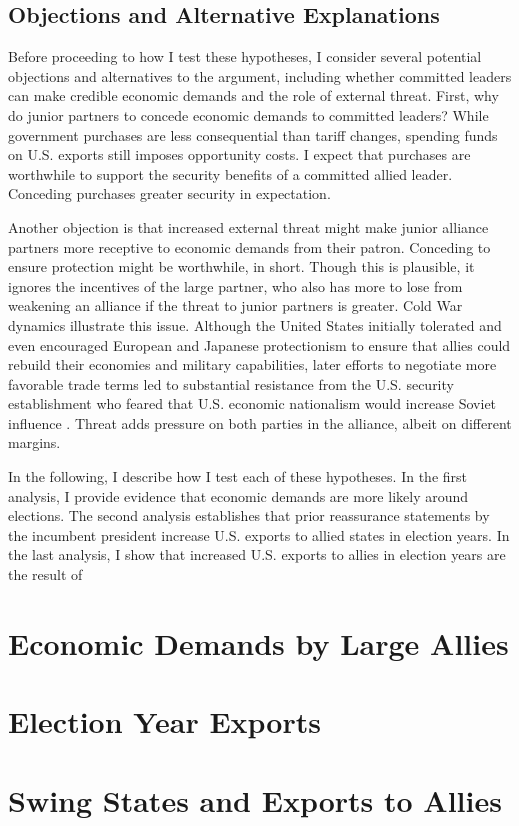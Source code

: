 \documentclass[12pt]{article}
\begin{document}
\subsection{Objections and Alternative Explanations}


Before proceeding to how I test these hypotheses, I consider several potential objections and alternatives to the argument, including whether committed leaders can make credible economic demands and the role of external threat.
First, why do junior partners to concede economic demands to committed leaders? 
While government purchases are less consequential than tariff changes, spending funds on U.S. exports still imposes opportunity costs.
I expect that purchases are worthwhile to support the security benefits of a committed allied leader. 
Conceding purchases greater security in expectation. 


Another objection is that increased external threat might make junior alliance partners more receptive to economic demands from their patron.
Conceding to ensure protection might be worthwhile, in short.
Though this is plausible, it ignores the incentives of the large partner, who also has more to lose from weakening an alliance if the threat to junior partners is greater. 
Cold War dynamics illustrate this issue.
Although the United States initially tolerated and even encouraged European and Japanese protectionism to ensure that allies could rebuild their economies and military capabilities, later efforts to negotiate more favorable trade terms led to substantial resistance from the U.S. security establishment who feared that U.S. economic nationalism would increase Soviet influence \citep{Mastanduno1998}.
Threat adds pressure on both parties in the alliance, albeit on different margins.


In the following, I describe how I test each of these hypotheses. 
In the first analysis, I provide evidence that economic demands are more likely around elections.
The second analysis establishes that prior reassurance statements by the incumbent president increase U.S. exports to allied states in election years. 
In the last analysis, I show that increased U.S. exports to allies in election years are the result of  


\section{Economic Demands by Large Allies}



\section{Election Year Exports}




\section{Swing States and Exports to Allies}



\singlespace
 
 
\end{document}
